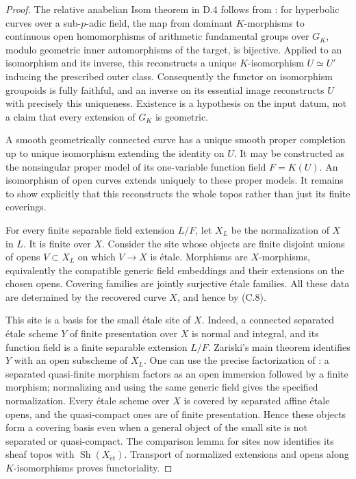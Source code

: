 \begin{proof}
The relative anabelian Isom theorem in D.4 follows from
\citet[Theorem A, equivalently Theorem 16.5 and its following
Remark]{Mochizuki1999}: for hyperbolic curves over a sub-$p$-adic
field, the map from dominant $K$-morphisms to continuous open
homomorphisms of arithmetic fundamental groups over $G_K$,
modulo geometric inner automorphisms of the target, is
bijective.  Applied to an isomorphism and its inverse, this
reconstructs a unique $K$-isomorphism $U\simeq U'$ inducing
the prescribed outer class.  Consequently the functor on
isomorphism groupoids is fully faithful, and an inverse on
its essential image reconstructs $U$ with precisely this
uniqueness.  Existence is a hypothesis on the input datum,
not a claim that every extension of $G_K$ is geometric.

A smooth geometrically connected curve has a unique smooth
proper completion up to unique isomorphism extending the
identity on $U$.  It may be constructed as the nonsingular
proper model of its one-variable function field $F=K(U)$.
An isomorphism of open curves extends uniquely to these
proper models.  It remains to show explicitly that this
reconstructs the whole topos rather than just its finite
coverings.

For every finite separable field extension $L/F$, let $X_L$
be the normalization of $X$ in $L$.  It is finite over $X$.
Consider the site whose objects are finite disjoint unions
of opens $V\subset X_L$ on which $V\to X$ is \'etale.
Morphisms are $X$-morphisms, equivalently the compatible
generic field embeddings and their extensions on the chosen
opens.  Covering families are jointly surjective \'etale
families.  All these data are determined by the recovered
curve $X$, and hence by (C.8).

This site is a basis for the small \'etale site of $X$.
Indeed, a connected separated \'etale scheme $Y$ of finite
presentation over $X$ is normal and integral, and its
function field is a finite separable extension $L/F$.
Zariski's main theorem identifies $Y$ with an open subscheme
of $X_L$.  One can use the precise factorization of
\citet[Lemmas 37.43.2 and 37.43.3, Tags 02LR and 05K0]{StacksBC}:
a separated quasi-finite morphism factors as an open
immersion followed by a finite morphism; normalizing and
using the same generic field gives the specified
normalization.  Every \'etale scheme over $X$ is covered
by separated affine \'etale opens, and the quasi-compact
ones are of finite presentation.  Hence these objects
form a covering basis even when a general object of the
small site is not separated or quasi-compact.  The
comparison lemma for sites now identifies its sheaf
topos with $\operatorname{Sh}(X_{\mathrm{\acute et}})$.
Transport of normalized extensions and opens along
$K$-isomorphisms proves functoriality.
\end{proof}


